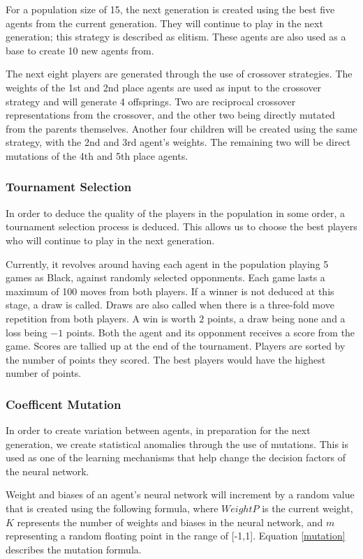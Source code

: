 \documentclass[12pt,a4paper]{article}
\begin{document}
    For a population size of 15, the next generation is created using the best five agents from the current generation. They will continue to play in the next generation; this strategy is described as elitism. These agents are also used as a base to create 10 new agents from. 
    
    The next eight players are generated through the use of crossover strategies. The weights of the 1st and 2nd place agents are used as input to the crossover strategy and will generate 4 offsprings. Two are reciprocal crossover representations from the crossover, and the other two being directly mutated from the parents themselves. Another four children will be created using the same strategy, with the 2nd and 3rd agent's weights. The remaining two will be direct mutations of the 4th and 5th place agents.

\subsubsection{Tournament Selection}

    In order to deduce the quality of the players in the population in some order, a tournament selection process is deduced. This allows us to choose the best players who will continue to play in the next generation.

    Currently, it revolves around having each agent in the population playing 5 games as Black, against randomly selected opponments. Each game lasts a maximum of 100 moves from both players. If a winner is not deduced at this stage, a draw is called. Draws are also called when there is a three-fold move repetition from both players. A win is worth $2$ points, a draw being none and a loss being $-1$ points. Both the agent and its opponment receives a score from the game. Scores are tallied up at the end of the tournament. Players are sorted by the number of points they scored. The best players would have the highest number of points.

\subsubsection{Coefficent Mutation}

    In order to create variation between agents, in preparation for the next generation, we create statistical anomalies through the use of mutations. This is used as one of the learning mechanisms that help change the decision factors of the neural network.

    Weight and biases of an agent's neural network will increment by a random value that is created using the following formula, where $WeightP$ is the current weight, $K$ represents the number of weights and biases in the neural network, and $m$ representing a random floating point in the range of [-1,1]. Equation \ref{mutation} describes the mutation formula.
\end{document}

